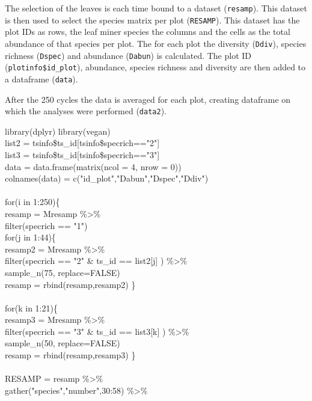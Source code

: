 \documentclass[b5paper,10pt]{book} %
\begin{document}
	The selection of the leaves is each time bound to a dataset (\texttt{resamp}). This dataset is then used to select the species matrix per plot (\texttt{RESAMP}). This dataset has the plot IDs as rows, the leaf miner species the columns and the cells as the total abundance of that species per plot. The for each plot the diversity (\texttt{Ddiv}), species richness (\texttt{Dspec}) and abundance (\texttt{Dabun}) is calculated. The plot ID (\texttt{plotinfo\$id\_plot}), abundance, species richness and diversity are then added to a dataframe (\texttt{data}).
	
	After the 250 cycles the data is averaged for each plot, creating dataframe on which the analyses were performed (\texttt{data2}).
\newpage
\begin{scriptsize}\begin{tt}
library(dplyr) library(vegan) \\
list2 = tsinfo\$ts\_id[tsinfo\$specrich=="2"] \\
list3 = tsinfo\$ts\_id[tsinfo\$specrich=="3"] \\
data = data.frame(matrix(ncol = 4, nrow = 0))  \\
colnames(data) = c("id\_plot","Dabun","Dspec","Ddiv")  \\
 \\
for(i in 1:250)\{  \\
resamp = Mresamp \%\textgreater\%  \\
  filter(specrich == "1")  \\
for(j in 1:44)\{  \\
resamp2 = Mresamp \%\textgreater\%  \\
  filter(specrich == "2" \& ts\_id == list2[j] ) \%\textgreater\%  \\
  sample\_n(75, replace=FALSE)  \\
resamp = rbind(resamp,resamp2)      \}  \\
 \\
for(k in 1:21)\{  \\
resamp3 = Mresamp \%\textgreater\%  \\
  filter(specrich == "3" \& ts\_id == list3[k] ) \%\textgreater\%  \\
  sample\_n(50, replace=FALSE)  \\
resamp = rbind(resamp,resamp3)      \}  \\
 \\
RESAMP = resamp \%\textgreater\%  \\
  gather("species","number",30:58) \%\textgreater\%  \\

\end{tt}
\end{scriptsize}
\end{document}
